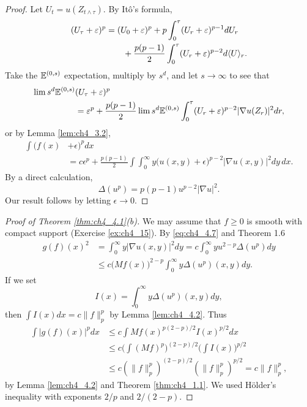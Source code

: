 \begin{proof}
Let $U_t = u(Z_{t\wedge\tau})$. By It\^o's formula,
\begin{align*}
    (U_\tau + \varepsilon)^p &= (U_0 + \varepsilon)^p + p \int_0^\tau (U_r + \varepsilon)^{p-1}dU_r \\
    &\qquad + \frac{p(p-1)}{2} \int_0^\tau (U_r + \varepsilon)^{p-2}d\langle U \rangle_r.
\end{align*}
Take the $\mathbb{E}^{(0,s)}$ expectation, multiply by $s^d$, and let $s \to \infty$ to see that
\begin{align*}
    \lim s^d\mathbb{E}^{(0,s)}&(U_\tau + \varepsilon)^p \\
    &= \varepsilon^p + \frac{p(p-1)}{2} \lim s^d\mathbb{E}^{(0,s)} \int_0^\tau (U_r + \varepsilon)^{p-2}|\nabla u(Z_r)|^2dr,
\end{align*}
or by Lemma \ref{lem:ch4_3.2},
\mpagebreak
\begin{align*}
    \int (f(x) &+ \epsilon)^pdx \\
    &= c\epsilon^p + \frac{p(p-1)}{2} \int \int_0^\infty y\big(u(x,y) + \epsilon\big)^{p-2}|\nabla u(x,y)|^2dy\,dx.
\end{align*}
By a direct calculation,
\begin{equation}\label{eq:ch4_4.7}
    \Delta(u^p) = p(p-1)u^{p-2}|\nabla u|^2.
\end{equation}
Our result follows by letting $\epsilon \to 0$.
\end{proof}

\begin{proof}[Proof of Theorem \ref{thm:ch4_4.1}(b)]
We may assume that $f \geq 0$ is smooth with compact support (Exercise \ref{ex:ch4_15}). By \eqref{eq:ch4_4.7} and Theorem 1.6
\begin{align*}
    g(f)(x)^2 &= \int_0^\infty y|\nabla u(x,y)|^2dy = c\int_0^\infty yu^{2-p}\Delta(u^p)dy \\
    &\leq c\big(Mf(x)\big)^{2-p} \int_0^\infty y\Delta(u^p)(x,y)dy.
\end{align*}
If we set
\[
    I(x) = \int_0^\infty y\Delta(u^p)(x,y)dy,
\]
then $\int I(x)dx = c\|f\|_p^p$ by Lemma \ref{lem:ch4_4.2}. Thus
\begin{align*}
    \int |g(f)(x)|^p dx &\leq c \int Mf(x)^{p(2-p)/2}I(x)^{p/2}dx \\
    &\leq c\Big(\int (Mf)^p\Big)^{(2-p)/2} \Big(\int I(x)\Big)^{p/2} \\
    &\leq c(\|f\|_p^p)^{(2-p)/2}(\|f\|_p^p)^{p/2} = c\|f\|_p^p,
\end{align*}
by Lemma \ref{lem:ch4_4.2} and Theorem \ref{thm:ch4_1.1}. We used H\"older's inequality with exponents $2/p$ and $2/(2-p)$.
\end{proof}

